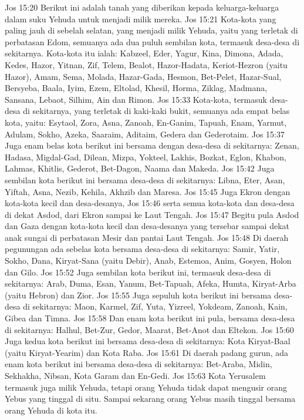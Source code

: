 Jos 15:20  Berikut ini adalah tanah yang diberikan kepada keluarga-keluarga dalam suku Yehuda untuk menjadi milik mereka.
Jos 15:21  Kota-kota yang paling jauh di sebelah selatan, yang menjadi milik Yehuda, yaitu yang terletak di perbatasan Edom, semuanya ada dua puluh sembilan kota, termasuk desa-desa di sekitarnya. Kota-kota itu ialah: Kabzeel, Eder, Yagur, Kina, Dimona, Adada, Kedes, Hazor, Yitnan, Zif, Telem, Bealot, Hazor-Hadata, Keriot-Hezron (yaitu Hazor), Amam, Sema, Molada, Hazar-Gada, Hesmon, Bet-Pelet, Hazar-Sual, Bersyeba, Baala, Iyim, Ezem, Eltolad, Khesil, Horma, Ziklag, Madmana, Sansana, Lebaot, Silhim, Ain dan Rimon.
Jos 15:33  Kota-kota, termasuk desa-desa di sekitarnya, yang terletak di kaki-kaki bukit, semuanya ada empat belas kota, yaitu: Esytaol, Zora, Asna, Zanoah, En-Ganim, Tapuah, Enam, Yarmut, Adulam, Sokho, Azeka, Saaraim, Aditaim, Gedera dan Gederotaim.
Jos 15:37  Juga enam belas kota berikut ini bersama dengan desa-desa di sekitarnya: Zenan, Hadasa, Migdal-Gad, Dilean, Mizpa, Yokteel, Lakhis, Bozkat, Eglon, Khabon, Lahmas, Khitlis, Gederot, Bet-Dagon, Naama dan Makeda.
Jos 15:42  Juga sembilan kota berikut ini bersama desa-desa di sekitarnya: Libna, Eter, Asan, Yiftah, Asna, Nezib, Kehila, Akhzib dan Maresa.
Jos 15:45  Juga Ekron dengan kota-kota kecil dan desa-desanya,
Jos 15:46  serta semua kota-kota dan desa-desa di dekat Asdod, dari Ekron sampai ke Laut Tengah.
Jos 15:47  Begitu pula Asdod dan Gaza dengan kota-kota kecil dan desa-desanya yang tersebar sampai dekat anak sungai di perbatasan Mesir dan pantai Laut Tengah.
Jos 15:48  Di daerah pegunungan ada sebelas kota bersama desa-desa di sekitarnya: Samir, Yatir, Sokho, Dana, Kiryat-Sana (yaitu Debir), Anab, Estemoa, Anim, Gosyen, Holon dan Gilo.
Jos 15:52  Juga sembilan kota berikut ini, termasuk desa-desa di sekitarnya: Arab, Duma, Esan, Yanum, Bet-Tapuah, Afeka, Humta, Kiryat-Arba (yaitu Hebron) dan Zior.
Jos 15:55  Juga sepuluh kota berikut ini bersama desa-desa di sekitarnya: Maon, Karmel, Zif, Yuta, Yizreel, Yokdeam, Zanoah, Kain, Gibea dan Timna.
Jos 15:58  Dan enam kota berikut ini pula, bersama desa-desa di sekitarnya: Halhul, Bet-Zur, Gedor, Maarat, Bet-Anot dan Eltekon.
Jos 15:60  Juga kedua kota berikut ini bersama desa-desa di sekitarnya: Kota Kiryat-Baal (yaitu Kiryat-Yearim) dan Kota Raba.
Jos 15:61  Di daerah padang gurun, ada enam kota berikut ini bersama desa-desa di sekitarnya: Bet-Araba, Midin, Sekhakha, Nibsan, Kota Garam dan En-Gedi.
Jos 15:63  Kota Yerusalem termasuk juga milik Yehuda, tetapi orang Yehuda tidak dapat mengusir orang Yebus yang tinggal di situ. Sampai sekarang orang Yebus masih tinggal bersama orang Yehuda di kota itu.
